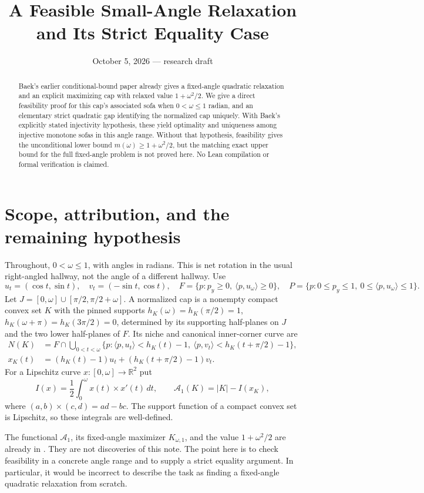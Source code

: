 \documentclass[11pt]{article}
\title{A Feasible Small-Angle Relaxation and Its Strict Equality Case}
\author{}
\date{October 5, 2026 --- research draft}
\theoremstyle{remark}\newtheorem{remark}[theorem]{Remark}
\newcommand{\R}{\mathbb R}
\newcommand{\area}[1]{\lvert #1\rvert}
\newcommand{\ip}[2]{\langle #1,#2\rangle}
\newcommand{\Aone}{\mathcal A_1}
\begin{document}
\maketitle
\begin{abstract}
Baek's earlier conditional-bound paper already gives a fixed-angle quadratic relaxation and an explicit maximizing cap with relaxed value $1+\omega^2/2$. We give a direct feasibility proof for this cap's associated sofa when $0<\omega\le1$ radian, and an elementary strict quadratic gap identifying the normalized cap uniquely. With Baek's explicitly stated injectivity hypothesis, these yield optimality and uniqueness among injective monotone sofas in this angle range. Without that hypothesis, feasibility gives the unconditional lower bound $m(\omega)\ge1+\omega^2/2$, but the matching exact upper bound for the full fixed-angle problem is not proved here. No Lean compilation or formal verification is claimed.
\end{abstract}

\section{Scope, attribution, and the remaining hypothesis}
Throughout, $0<\omega\le1$, with angles in radians. This is net rotation in the usual right-angled hallway, not the angle of a different hallway. Use
\[
 u_t=(\cos t,\sin t),\quad v_t=(-\sin t,\cos t),\quad
 F=\{p:p_y\ge0,\ \ip p{u_\omega}\ge0\},\quad
 P=\{p:0\le p_y\le1,\ 0\le\ip p{u_\omega}\le1\}.
\]
Let $J=[0,\omega]\cup[\pi/2,\pi/2+\omega]$. A normalized cap is a nonempty compact convex set $K$ with the pinned supports $h_K(\omega)=h_K(\pi/2)=1$, $h_K(\omega+\pi)=h_K(3\pi/2)=0$, determined by its supporting half-planes on $J$ and the two lower half-planes of $F$. Its niche and canonical inner-corner curve are
\begin{align*}
 N(K)&=F\cap\bigcup_{0<t<\omega}\{p:\ip p{u_t}<h_K(t)-1,\ \ip p{v_t}<h_K(t+\pi/2)-1\},\\
 x_K(t)&=(h_K(t)-1)u_t+(h_K(t+\pi/2)-1)v_t.
\end{align*}
For a Lipschitz curve $x:[0,\omega]\to\R^2$ put
\[
 I(x)=\frac12\int_0^\omega x(t)\times x'(t)\,dt,\qquad
 \Aone(K)=\area K-I(x_K),
\]
where $(a,b)\times(c,d)=ad-bc$. The support function of a compact convex set is Lipschitz, so these integrals are well-defined.

The functional $\Aone$, its fixed-angle maximizer $K_{\omega,1}$, and the value $1+\omega^2/2$ are already in \cite[Definition 5.1, Definition 5.12, Theorems 5.30 and 5.32]{BaekConditional}. They are not discoveries of this note. The point here is to check feasibility in a concrete angle range and to supply a strict equality argument. In particular, it would be incorrect to describe the task as finding a fixed-angle quadratic relaxation from scratch.
\end{document}
